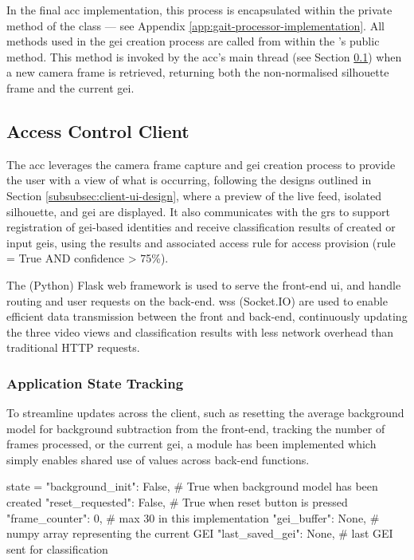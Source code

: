 In the final \ac{acc} implementation, this process is encapsulated within the private  method of the  class --- see Appendix \ref{app:gait-processor-implementation}.
All methods used in the \ac{gei} creation process are called from within the 's public  method.
This method is invoked by the \ac{acc}'s main thread (see Section \ref{subsec:access-control-client-implementation}) when a new camera frame is retrieved, returning both the non-normalised silhouette frame and the current \ac{gei}.

\subsection{Access Control Client}
\label{subsec:access-control-client-implementation}

The \ac{acc} leverages the camera frame capture and \ac{gei} creation process to provide the user with a view of what is occurring, following the designs outlined in Section \ref{subsubsec:client-ui-design}, where a preview of the live feed, isolated silhouette, and \ac{gei} are displayed.
It also communicates with the \ac{grs} to support registration of \ac{gei}-based identities and receive classification results of created or input \acp{gei}, using the results and associated access rule for access provision (rule = True AND confidence > 75\%).

The (Python) Flask web framework is used to serve the front-end \ac{ui}, and handle routing and user requests on the back-end. \acp{ws} (Socket.IO) are used to enable efficient data transmission between the front and back-end, continuously updating the three video views and classification results with less network overhead than traditional HTTP requests.

\subsubsection{Application State Tracking}
\label{subsubsec:application-state-tracking}

To streamline updates across the client, such as resetting the average background model for background subtraction from the front-end, tracking the number of frames processed, or the current \ac{gei}, a  module has been implemented which simply enables shared use of values across back-end functions. 

\begin{code}[minted language=python]
state = {
	"background_init": False, # True when background model has been created
	"reset_requested": False, # True when reset button is pressed
	"frame_counter": 0, # max 30 in this implementation
	"gei_buffer": None, # numpy array representing the current GEI
	"last_saved_gei": None, # last GEI sent for classification
}
\end{code}
\label{lst:state-configuration} \vspace{10pt}

